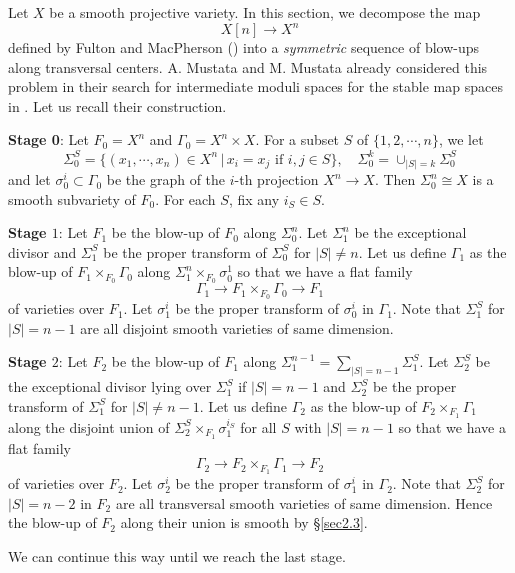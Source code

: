\documentclass[10pt]{amsart}
\theoremstyle{definition}
\begin{document}
Let $X$ be a smooth projective variety. In this section, we
decompose the map $$X[n]\to X^n$$ defined by Fulton and MacPherson
(\cite{FM}) into a \emph{symmetric} sequence of blow-ups along
transversal centers. A. Mustata and M. Mustata already considered
this problem in their search for intermediate moduli spaces for
the stable map spaces in \cite[\S1]{Mustata}. Let us recall their
construction.

\bigskip

\noindent \textbf{Stage 0}: Let $F_0=X^n$ and $\Gamma_0=X^n\times
X$. For a subset $S$ of $\{1,2,\cdots,n\}$, we let
\[
\Sigma^S_0=\{(x_1,\cdots,x_n)\in X^n\,|\, x_i=x_j \text{ if }
i,j\in S\}, \quad \Sigma^k_0=\cup_{|S|=k}\Sigma_0^S
\]
and let  $\sigma^i_0\subset \Gamma_0$ be the graph of the $i$-th
projection $X^n\to X$. Then $\Sigma_0^n\cong X$ is a smooth
subvariety of $F_0$. For each $S$, fix any $i_S\in S$.

\bigskip

\noindent \textbf{Stage $1$}: Let $F_1$ be the blow-up of $F_0$
along $\Sigma_0^n$. Let $\Sigma_1^n$ be the exceptional divisor
and $\Sigma_1^S$ be the proper transform of $\Sigma_0^S$ for
$|S|\ne n$. Let us define $\Gamma_1$ as the blow-up of
$F_1\times_{F_0}\Gamma_0$ along $\Sigma^n_1\times_{F_0}\sigma^1_0$
so that we have a flat family
\[
\Gamma_1\to F_1\times_{F_0}\Gamma_0 \to F_1
\]
of varieties over $F_1$. Let $\sigma_1^i$ be the proper transform
of $\sigma_0^i$ in $\Gamma_1$. Note that $\Sigma^S_{1}$ for
$|S|=n-1$ are all disjoint smooth varieties of same dimension.


\bigskip

\noindent \textbf{Stage $2$}: Let $F_2$ be the blow-up of $F_1$
along $\Sigma_1^{n-1}=\sum_{|S|=n-1}\Sigma_1^S$. Let $\Sigma_2^S$
be the exceptional divisor lying over $\Sigma_1^S$ if $|S|=n-1$
and $\Sigma_2^S$ be the proper transform of $\Sigma_1^S$ for
$|S|\ne n-1$. Let us define $\Gamma_2$ as the blow-up of
$F_2\times_{F_1}\Gamma_1$ along the disjoint union of
$\Sigma^S_2\times_{F_1}\sigma^{i_S}_1$ for all $S$ with $|S|=n-1$
so that we have a flat family
\[
\Gamma_2\to F_2\times_{F_1}\Gamma_1 \to F_2
\]
of varieties over $F_2$. Let $\sigma_2^i$ be the proper transform
of $\sigma_1^i$ in $\Gamma_2$. Note that $\Sigma^S_{2}$ for
$|S|=n-2$ in $F_2$ are all transversal smooth varieties of same
dimension. Hence the blow-up of $F_2$ along their union is smooth
by \S\ref{sec2.3}.


\bigskip

We can continue this way until we reach the last stage.
\end{document}
